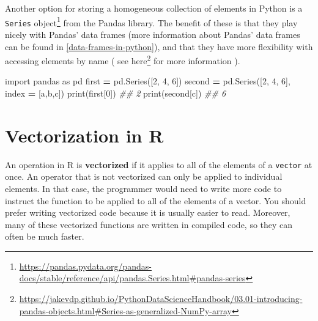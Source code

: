\documentclass[
  12pt,
  krantz2]{krantz}
\makeatletter
\newenvironment{Shaded}{\begin{snugshade}}{\end{snugshade}}
\newcommand{\BuiltInTok}[1]{#1}
\newcommand{\CommentTok}[1]{\textcolor[rgb]{0.37,0.37,0.37}{\textit{#1}}}
\newcommand{\DecValTok}[1]{\textcolor[rgb]{0.06,0.06,0.06}{#1}}
\newcommand{\ImportTok}[1]{#1}
\newcommand{\NormalTok}[1]{#1}
\newcommand{\OperatorTok}[1]{\textcolor[rgb]{0.43,0.43,0.43}{\textbf{#1}}}
\newcommand{\StringTok}[1]{\textcolor[rgb]{0.5,0.5,0.5}{#1}}
\renewcommand{\href}[2]{#2\footnote{\url{#1}}}
\newenvironment{kframe}{%
\medskip{}
\setlength{\fboxsep}{.8em}
 \def\at@end@of@kframe{}%
 \ifinner\ifhmode%
  \def\at@end@of@kframe{\end{minipage}}%
  \begin{minipage}{\columnwidth}%
 \fi\fi%
 \def\FrameCommand##1{\hskip\@totalleftmargin \hskip-\fboxsep
 \colorbox{shadecolor}{##1}\hskip-\fboxsep
     \hskip-\linewidth \hskip-\@totalleftmargin \hskip\columnwidth}%
 \MakeFramed {\advance\hsize-\width
   \@totalleftmargin\z@ \linewidth\hsize
   \@setminipage}}%
 {\par\unskip\endMakeFramed%
 \at@end@of@kframe}
\renewenvironment{Shaded}{\begin{kframe}}{\end{kframe}}
\makeatother
\begin{document}
Another option for storing a homogeneous collection of elements in Python is a \href{https://pandas.pydata.org/pandas-docs/stable/reference/api/pandas.Series.html\#pandas-series}{\texttt{Series} object} from the Pandas library. The benefit of these is that they play nicely with Pandas' data frames (more information about Pandas' data frames can be found in \ref{data-frames-in-python}), and that they have more flexibility with accessing elements by name ( see \href{https://jakevdp.github.io/PythonDataScienceHandbook/03.01-introducing-pandas-objects.html\#Series-as-generalized-NumPy-array}{here} for more information ).

\begin{Shaded}
\begin{Highlighting}[]
\ImportTok{import}\NormalTok{ pandas }\ImportTok{as}\NormalTok{ pd}
\NormalTok{first }\OperatorTok{=}\NormalTok{ pd.Series([}\DecValTok{2}\NormalTok{, }\DecValTok{4}\NormalTok{, }\DecValTok{6}\NormalTok{])}
\NormalTok{second }\OperatorTok{=}\NormalTok{ pd.Series([}\DecValTok{2}\NormalTok{, }\DecValTok{4}\NormalTok{, }\DecValTok{6}\NormalTok{], index }\OperatorTok{=}\NormalTok{ [}\StringTok{\textquotesingle{}a\textquotesingle{}}\NormalTok{,}\StringTok{\textquotesingle{}b\textquotesingle{}}\NormalTok{,}\StringTok{\textquotesingle{}c\textquotesingle{}}\NormalTok{])}
\BuiltInTok{print}\NormalTok{(first[}\DecValTok{0}\NormalTok{])}
\CommentTok{\#\# 2}
\BuiltInTok{print}\NormalTok{(second[}\StringTok{\textquotesingle{}c\textquotesingle{}}\NormalTok{])}
\CommentTok{\#\# 6}
\end{Highlighting}
\end{Shaded}

\hypertarget{vectorization-in-r}{%
\section{Vectorization in R}\label{vectorization-in-r}}

An operation in R is \textbf{vectorized} if it applies to all of the elements of a \texttt{vector} at once. An operator that is not vectorized can only be applied to individual elements. In that case, the programmer would need to write more code to instruct the function to be applied to all of the elements of a vector. You should prefer writing vectorized code because it is usually easier to read. Moreover, many of these vectorized functions are written in compiled code, so they can often be much faster.
\end{document}
